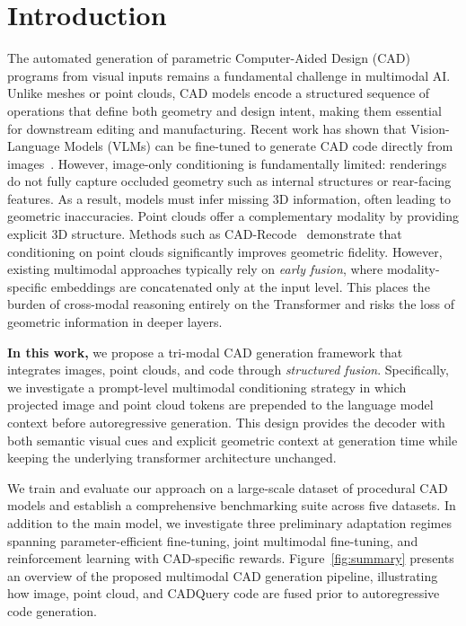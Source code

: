 \documentclass{article}
\begin{document}
\section{Introduction}
The automated generation of parametric Computer-Aided Design (CAD) programs from visual inputs remains a fundamental challenge in multimodal AI. Unlike meshes or point clouds, CAD models encode a structured sequence of operations that define both geometry and design intent, making them essential for downstream editing and manufacturing. Recent work has shown that Vision-Language Models (VLMs) can be fine-tuned to generate CAD code directly from images~\cite{cadcoder}. However, image-only conditioning is fundamentally limited: renderings do not fully capture occluded geometry such as internal structures or rear-facing features. As a result, models must infer missing 3D information, often leading to geometric inaccuracies. 
Point clouds offer a complementary modality by providing explicit 3D structure. Methods such as CAD-Recode~\cite{cadrecode} demonstrate that conditioning on point clouds significantly improves geometric fidelity. However, existing multimodal approaches typically rely on \emph{early fusion}, where modality-specific embeddings are concatenated only at the input level. This places the burden of cross-modal reasoning entirely on the Transformer and risks the loss of geometric information in deeper layers.

\textbf{In this work,} we propose a tri-modal CAD generation framework that integrates images, point clouds, and code through \emph{structured fusion}. Specifically, we investigate a prompt-level multimodal conditioning strategy in which projected image and point cloud tokens are prepended to the language model context before autoregressive generation. This design provides the decoder with both semantic visual cues and explicit geometric context at generation time while keeping the underlying transformer architecture unchanged.

We train and evaluate our approach on a large-scale dataset of procedural CAD models and establish a comprehensive benchmarking suite across five datasets. In addition to the main model, we investigate three preliminary adaptation regimes spanning parameter-efficient fine-tuning, joint multimodal fine-tuning, and reinforcement learning with CAD-specific rewards. Figure~\ref{fig:summary} presents an overview of the proposed multimodal CAD generation pipeline, illustrating how image, point cloud, and CADQuery code are fused prior to autoregressive code generation.
\end{document}

